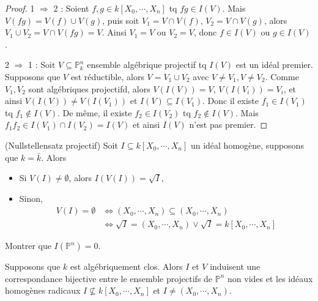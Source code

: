         \begin{proof}
            \item 1 $\Rightarrow$ 2 : Soient $f,g \in k[X_0, \cdots, X_n]$ tq $fg \in I(V)$. Mais $V(fg) = V(f) \cup V(g)$, puis soit $V_1 = V \cap V(f)$, $V_2 = V \cap V(g)$, alors $V_1 \cup V_2 = V \cap V(fg) = V$. Ainsi $V_1 = V$ ou $V_2 = V$, donc $f \in I(V)$ ou $g \in I(V)$.
            \item 2 $\Rightarrow$ 1 : Soit $V \subseteq \mathbb{P}_k^n$ ensemble algébrique projectif tq $I(V)$ est un idéal premier. Supposons que $V$ est réductible, alors $V = V_1 \cup V_2$ avec $V \neq V_1, V \neq V_2$. Comme $V_1,V_2$ sont algébriques projectifd, alors $V(I(V)) = V$, $V(I(V_i)) = V_i$, et ainsi $V(I(V)) \neq V(I(V_1))$ et $I(V) \subseteq I(V_1)$. Donc il existe $f_1 \in I(V_1)$ tq $f_1 \notin I(V)$. De même, il existe $f_2 \in I(V_2)$ tq $f_2 \notin I(V)$. Mais $f_1f_2 \in I(V_1) \cap I(V_2) = I(V)$ et ainsi $I(V)$ n'est pas premier.
        \end{proof}
        \begin{theo} (Nullstellensatz projectif)
            Soit $I \subseteq k[X_0, \cdots, X_n]$ un idéal homogène, supposons que $k = \bar k$. Alors
            \begin{itemize}
                \item Si $V(I) \neq \emptyset$, alors $I(V(I)) = \sqrt{I}$,
                \item Sinon, \begin{align*}
                    V(I) = \emptyset &\iff (X_0, \cdots, X_n) \subseteq (X_0, \cdots, X_n)\\
                    &\iff \sqrt{I} = (X_0, \cdots, X_n) \lor \sqrt{I} = k[X_0, \cdots, X_n]
                \end{align*}
            \end{itemize}
        \end{theo}
        \begin{exo}
            Montrer que $I(\mathbb{P}^n) = 0$.
        \end{exo}
        \begin{coro}
            Supposons que $k$ est algébriquement clos. Alors $I$ et $V$ induisent une correspondance bijective entre le ensemble projectifs de $\mathbb{P}^n$ non vides et les idéaux homogènes radicaux $I \nsubseteq k[X_0, \cdots, X_n]$ et $I \neq (X_0, \cdots, X_n)$.
        \end{coro}

